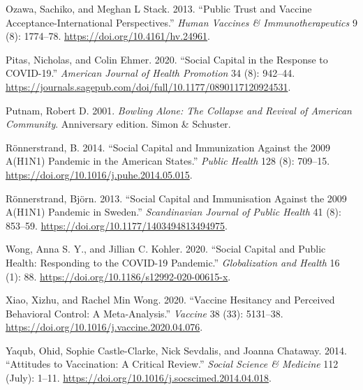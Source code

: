 \documentclass[
]{article}
\newlength{\cslhangindent}
\newlength{\cslentryspacingunit} %
\newenvironment{CSLReferences}[2] %
 {%
  \setlength{\parindent}{0pt}
  \ifodd #1
  \let\oldpar\par
  \def\par{\hangindent=\cslhangindent\oldpar}
  \fi
  \setlength{\parskip}{#2\cslentryspacingunit}
 }%
 {}
\begin{document}
\begin{CSLReferences}{1}{0}
\leavevmode{}%
Ozawa, Sachiko, and Meghan L Stack. 2013. {``Public Trust and Vaccine
Acceptance-International Perspectives.''} \emph{Human Vaccines \&
Immunotherapeutics} 9 (8): 1774--78.
\url{https://doi.org/10.4161/hv.24961}.

\leavevmode{}%
Pitas, Nicholas, and Colin Ehmer. 2020. {``Social {Capital} in the
{Response} to {COVID}-19.''} \emph{American Journal of Health Promotion}
34 (8): 942--44.
\url{https://journals.sagepub.com/doi/full/10.1177/0890117120924531}.

\leavevmode{}%
Putnam, Robert D. 2001. \emph{Bowling {Alone}: {The} {Collapse} and
{Revival} of {American} {Community}}. Anniversary edition. Simon \&
Schuster.

\leavevmode{}%
Rönnerstrand, B. 2014. {``Social Capital and Immunization Against the
2009 {A}({H1N1}) Pandemic in the {American} {States}.''} \emph{Public
Health} 128 (8): 709--15.
\url{https://doi.org/10.1016/j.puhe.2014.05.015}.

\leavevmode{}%
Rönnerstrand, Björn. 2013. {``Social Capital and Immunisation Against
the 2009 {A}({H1N1}) Pandemic in {Sweden}.''} \emph{Scandinavian Journal
of Public Health} 41 (8): 853--59.
\url{https://doi.org/10.1177/1403494813494975}.

\leavevmode{}%
Wong, Anna S. Y., and Jillian C. Kohler. 2020. {``Social Capital and
Public Health: Responding to the {COVID}-19 Pandemic.''}
\emph{Globalization and Health} 16 (1): 88.
\url{https://doi.org/10.1186/s12992-020-00615-x}.

\leavevmode{}%
Xiao, Xizhu, and Rachel Min Wong. 2020. {``Vaccine Hesitancy and
Perceived Behavioral Control: {A} Meta-Analysis.''} \emph{Vaccine} 38
(33): 5131--38. \url{https://doi.org/10.1016/j.vaccine.2020.04.076}.

\leavevmode{}%
Yaqub, Ohid, Sophie Castle-Clarke, Nick Sevdalis, and Joanna Chataway.
2014. {``Attitudes to Vaccination: {A} Critical Review.''} \emph{Social
Science \& Medicine} 112 (July): 1--11.
\url{https://doi.org/10.1016/j.socscimed.2014.04.018}.

\end{CSLReferences}
\end{document}

